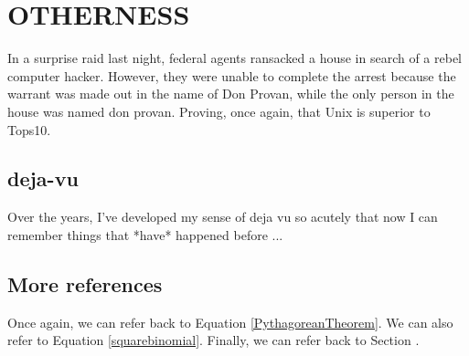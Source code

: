 \chapter{\texorpdfstring{OTHERNESS}{}} %
\setcounter{equation}{0} 

In a surprise raid last night, federal agents ransacked a house in search
of a rebel computer hacker.  However, they were unable to complete the arrest
because the warrant was made out in the name of Don Provan, while the only
person in the house was named don provan.  Proving, once again, that Unix is
superior to Tops10.

\section{deja-vu}

Over the years, I've developed my sense of deja vu so acutely that now
I can remember things that *have* happened before ...

\section{More references}

Once again, we can refer back to Equation \ref{PythagoreanTheorem}.
We can also refer to Equation \ref{squarebinomial}.
Finally, we can refer back to Section \label{AdditionalNumberedResults}.






